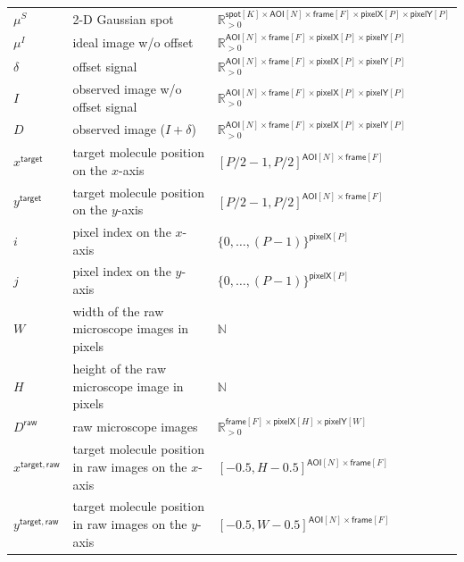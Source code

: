\begin{table}[h]
\begin{tabular}{l l l}
$\mu^S$ & 2-D Gaussian spot & $\mathbb{R}_{>0}^{\mathsf{spot}[K] \times \mathsf{AOI}[N] \times \mathsf{frame}[F] \times \mathsf{pixelX}[P] \times \mathsf{pixelY}[P]}$ \rule{0pt}{3ex} \\
$\mu^I$ & ideal image w/o offset & $\mathbb{R}_{>0}^{\mathsf{AOI}[N] \times \mathsf{frame}[F] \times \mathsf{pixelX}[P] \times \mathsf{pixelY}[P]}$ \rule{0pt}{3ex} \\
$\delta$ & offset signal & $\mathbb{R}_{>0}^{\mathsf{AOI}[N] \times \mathsf{frame}[F] \times \mathsf{pixelX}[P] \times \mathsf{pixelY}[P]}$ \rule{0pt}{3ex} \\
$I$ & observed image w/o offset signal & $\mathbb{R}_{>0}^{\mathsf{AOI}[N] \times \mathsf{frame}[F] \times \mathsf{pixelX}[P] \times \mathsf{pixelY}[P]}$ \rule{0pt}{3ex} \\
$D$ & observed image ($I + \delta$) & $\mathbb{R}_{>0}^{\mathsf{AOI}[N] \times \mathsf{frame}[F] \times \mathsf{pixelX}[P] \times \mathsf{pixelY}[P]}$ \rule{0pt}{3ex} \\
$x^\mathsf{target}$ & target molecule position on the $x$-axis & $[P/2-1, P/2]^{\mathsf{AOI}[N] \times \mathsf{frame}[F]}$ \rule{0pt}{3ex} \\
$y^\mathsf{target}$ & target molecule position on the $y$-axis & $[P/2-1, P/2]^{\mathsf{AOI}[N] \times \mathsf{frame}[F]}$ \rule{0pt}{3ex} \\
$i$ & pixel index on the $x$-axis & $\{0, \dots, (P-1)\}^{\mathsf{pixelX}[P]}$ \rule{0pt}{3ex} \\
$j$ & pixel index on the $y$-axis & $\{0, \dots, (P-1)\}^{\mathsf{pixelX}[P]}$ \rule{0pt}{3ex} \\
$W$ & width of the raw microscope images in pixels & $\mathbb{N}$ \rule{0pt}{3ex} \\
$H$ & height of the raw microscope image in pixels & $\mathbb{N}$ \rule{0pt}{3ex} \\
$D^\mathsf{raw}$ & raw microscope images & $\mathbb{R}_{>0}^{\mathsf{frame}[F] \times \mathsf{pixelX}[H] \times \mathsf{pixelY}[W]}$ \rule{0pt}{3ex} \\
$x^{\mathsf{target}, \mathsf{raw}}$ & target molecule position in raw images on the $x$-axis & $[-0.5, H-0.5]^{\mathsf{AOI}[N] \times \mathsf{frame}[F]}$ \rule{0pt}{3ex} \\
$y^{\mathsf{target}, \mathsf{raw}}$ & target molecule position in raw images on the $y$-axis & $[-0.5, W-0.5]^{\mathsf{AOI}[N] \times \mathsf{frame}[F]}$ \rule{0pt}{3ex} \\
\bottomrule
\end{tabular}
\end{table}
\clearpage
\pagebreak


